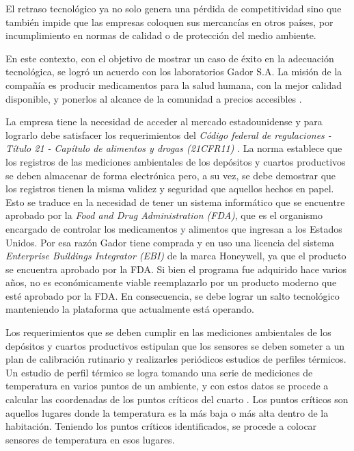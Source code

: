 El retraso tecnológico ya no solo genera una pérdida de competitividad sino que también impide que las empresas coloquen sus mercancías en otros países, por incumplimiento en normas de calidad o de protección del medio ambiente.
		
En este contexto, con el objetivo de mostrar un caso de éxito en la adecuación tecnológica, se logró un acuerdo con los laboratorios Gador S.A.
La misión de la compañía es producir medicamentos para la salud humana, con la mejor calidad disponible, y ponerlos al alcance de la comunidad a precios accesibles \citep{WEBSITE:Gador}.

La empresa tiene la necesidad de acceder al mercado estadounidense y para lograrlo debe satisfacer los requerimientos del \emph{Código federal de regulaciones - Título 21 - Capítulo de alimentos y drogas (21CFR11)} \citep{ARTICLE:21cfr11}.
La norma establece que los registros de las mediciones ambientales de los depósitos y cuartos productivos se deben almacenar de forma electrónica pero, a su vez, se debe demostrar que los registros tienen la misma validez y seguridad que aquellos hechos en papel. 
Esto se traduce en la necesidad de tener un sistema informático que se encuentre aprobado por la \emph{Food and Drug Administration (FDA)}, que es el organismo encargado de controlar los medicamentos y alimentos que ingresan a los Estados Unidos.
Por esa razón Gador tiene comprada y en uso una licencia del sistema \emph{Enterprise Buildings Integrator (EBI)} de la marca Honeywell, ya que el producto se encuentra aprobado por la FDA. 
Si bien el programa fue adquirido hace varios años, no es económicamente viable reemplazarlo por un producto moderno que esté aprobado por la FDA.
En consecuencia, se debe lograr un salto tecnológico manteniendo la plataforma que actualmente está operando.

Los requerimientos que se deben cumplir en las mediciones ambientales de los depósitos y cuartos productivos estipulan que los sensores se deben someter a un plan de calibración rutinario y realizarles periódicos estudios de perfiles térmicos.
Un estudio de perfil térmico se logra tomando una serie de mediciones de temperatura en varios puntos de un ambiente, y con estos datos se procede a calcular las coordenadas de los puntos críticos del cuarto \citep{ARTICLE:Temperature}.
Los puntos críticos son aquellos lugares donde la temperatura es la más baja o más alta dentro de la habitación.
Teniendo los puntos críticos identificados, se procede a colocar sensores de temperatura en esos lugares.

